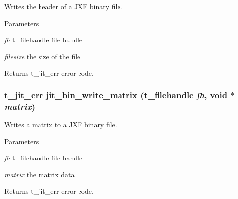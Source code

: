 Writes the header of a JXF binary file. 
\begin{DoxyParams}{Parameters}
\item[{\em fh}]t\_\-filehandle file handle \item[{\em filesize}]the size of the file\end{DoxyParams}
\begin{DoxyReturn}{Returns}
t\_\-jit\_\-err error code. 
\end{DoxyReturn}
\hypertarget{group__binmod_ga8102ed7929a540a5584505049870887a}{
\subsubsection[{jit\_\-bin\_\-write\_\-matrix}]{\setlength{\rightskip}{0pt plus 5cm}t\_\-jit\_\-err jit\_\-bin\_\-write\_\-matrix ({\bf t\_\-filehandle} {\em fh}, \/  void $\ast$ {\em matrix})}}
\label{group__binmod_ga8102ed7929a540a5584505049870887a}


Writes a matrix to a JXF binary file. 
\begin{DoxyParams}{Parameters}
\item[{\em fh}]t\_\-filehandle file handle \item[{\em matrix}]the matrix data\end{DoxyParams}
\begin{DoxyReturn}{Returns}
t\_\-jit\_\-err error code. 
\end{DoxyReturn}

